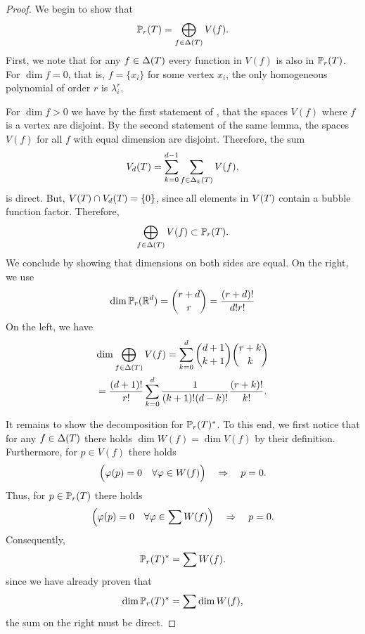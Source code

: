 \begin{proof}
  We begin to show that
  \begin{gather}
    \P_r(\cell) = \bigoplus_{f\in\Delta(\cell)}V(f).
  \end{gather}
  First, we note that for any $f\in\Delta(\cell)$ every function in $V(f)$
  is also in $\P_r(\cell)$.  For $\dim f=0$, that is, $f=\{x_i\}$ for some
  vertex $x_i$, the only homogeneous polynomial of order $r$ is $\lambda_i^r$.

  For $\dim f > 0$ we have by the first statement of
  , that the spaces $V(f)$
  where $f$ is a vertex are disjoint. By the second statement of the
  same lemma, the spaces $V(f)$ for all $f$ with equal dimension are
  disjoint. Therefore, the sum
  \begin{gather}
    V_d(\cell) = \sum_{k=0}^{d-1} \sum_{f\in \Delta_k(\cell)} V(f),
  \end{gather}
  is direct. But, $V(\cell) \cap V_d(\cell) = \{0\}$, since all elements in
  $V(\cell)$ contain a bubble function factor. Therefore,
  \begin{gather}
    \bigoplus_{f\in\Delta(\cell)}V(f) \subset \P_r(\cell).
  \end{gather}
  We conclude by showing that dimensions on both sides are equal.
  On the right, we use
  \begin{gather}
    \dim \P_r(\R^d) = \binom{r+d}{r} = \frac{(r+d)!}{d!r!}
  \end{gather}
  On the left, we have
  \begin{multline}
    \dim \bigoplus_{f\in\Delta(\cell)}V(f) =
    \sum_{k=0}^{d} \binom{d+1}{k+1} \binom{r+k}{k}
    \\
    = \frac{(d+1)!}{r!}
    \sum_{k=0}^{d} \frac{1}{(k+1)!(d-k)!} \frac{(r+k)!}{k!}.
  \end{multline}


  It remains to show the decomposition for $\P_r(\cell)^*$. To this
  end, we first notice that for any $f\in\Delta(\cell)$ there holds
  $\dim W(f) = \dim V(f)$ by their definition. Furthermore, for
  $p\in V(f)$ there holds
  \begin{gather}
    \Bigl(\phi(p) = 0 \quad\forall \phi\in W(f)\Bigr)
    \quad\Rightarrow\quad
    p=0.
  \end{gather}
  Thus, for $p\in \P_r(\cell)$ there holds
  \begin{gather}
    \Bigl(\phi(p) = 0 \quad\forall \phi\in \sum W(f)\Bigr)
    \quad\Rightarrow\quad
    p=0.
  \end{gather}
  Consequently,
  \begin{gather}
    \P_r(\cell)^* = \sum W(f).
  \end{gather}
  since we have already proven that
  \begin{gather}
    \dim \P_r(\cell)^* = \sum \dim W(f),
  \end{gather}
  the sum on the right must be direct.
\end{proof}


